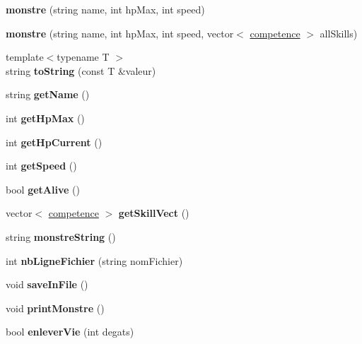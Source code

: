 \begin{DoxyCompactItemize}
\item 
\mbox{\label{classmonstre_a582e69a0b41162732689977e9eb5950e}} 
{\bfseries monstre} (string name, int hp\+Max, int speed)
\item 
\mbox{\label{classmonstre_a74ee17231870ff10a0a13ee498c9e9eb}} 
{\bfseries monstre} (string name, int hp\+Max, int speed, vector$<$ \hyperlink{classcompetence}{competence} $>$ all\+Skills)
\item 
\mbox{\label{classmonstre_a4d4035146a1735590b49dacba3de365a}} 
{\footnotesize template$<$typename T $>$ }\\string {\bfseries to\+String} (const T \&valeur)
\item 
\mbox{\label{classmonstre_a73c4a866b9ce17baf4a95ba606ef687b}} 
string {\bfseries get\+Name} ()
\item 
\mbox{\label{classmonstre_aefac39c9ae67b300c2a69bfdd29662b2}} 
int {\bfseries get\+Hp\+Max} ()
\item 
\mbox{\label{classmonstre_a5cda5112e283bc62d0a8a2d8c21885e2}} 
int {\bfseries get\+Hp\+Current} ()
\item 
\mbox{\label{classmonstre_a0177c6bac35608e9c940de2550f0b3be}} 
int {\bfseries get\+Speed} ()
\item 
\mbox{\label{classmonstre_a7b92c8b92f0e30c4e90b6e797124a841}} 
bool {\bfseries get\+Alive} ()
\item 
\mbox{\label{classmonstre_a419c247247df89829d798bc037dd09c7}} 
vector$<$ \hyperlink{classcompetence}{competence} $>$ {\bfseries get\+Skill\+Vect} ()
\item 
\mbox{\label{classmonstre_a0098d2cf04819866e75a68842bc9d32e}} 
string {\bfseries monstre\+String} ()
\item 
\mbox{\label{classmonstre_a44c5190667cd30a176170f8a97db0b6e}} 
int {\bfseries nb\+Ligne\+Fichier} (string nom\+Fichier)
\item 
\mbox{\label{classmonstre_ad3d2efc38609b3857e542423809a566d}} 
void {\bfseries save\+In\+File} ()
\item 
\mbox{\label{classmonstre_aeb60395664bbca7846e037b058b5c716}} 
void {\bfseries print\+Monstre} ()
\item 
\mbox{\label{classmonstre_af5b61c4c0e2118760ce6f610bf9349e2}} 
bool {\bfseries enlever\+Vie} (int degats)
\end{DoxyCompactItemize}
